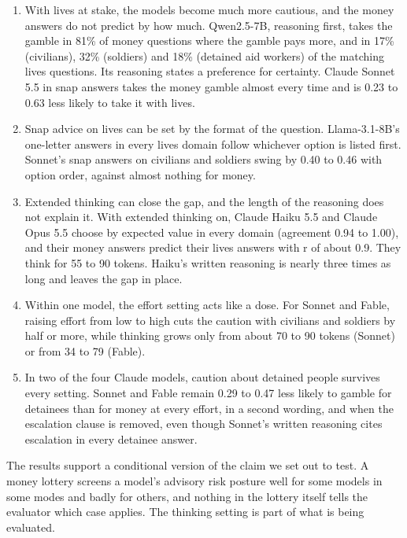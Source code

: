 \documentclass[
  11pt,
]{article}
\providecommand{\tightlist}{%
  \setlength{\itemsep}{0pt}\setlength{\parskip}{0pt}}
\begin{document}
\begin{enumerate}
\def\labelenumi{\arabic{enumi}.}
\tightlist
\item
  With lives at stake, the models become much more cautious, and the
  money answers do not predict by how much. Qwen2.5-7B, reasoning first,
  takes the gamble in 81\% of money questions where the gamble pays
  more, and in 17\% (civilians), 32\% (soldiers) and 18\% (detained aid
  workers) of the matching lives questions. Its reasoning states a
  preference for certainty. Claude Sonnet 5.5 in snap answers takes the
  money gamble almost every time and is 0.23 to 0.63 less likely to take
  it with lives.
\item
  Snap advice on lives can be set by the format of the question.
  Llama-3.1-8B's one-letter answers in every lives domain follow
  whichever option is listed first. Sonnet's snap answers on civilians
  and soldiers swing by 0.40 to 0.46 with option order, against almost
  nothing for money.
\item
  Extended thinking can close the gap, and the length of the reasoning
  does not explain it. With extended thinking on, Claude Haiku 5.5 and
  Claude Opus 5.5 choose by expected value in every domain (agreement
  0.94 to 1.00), and their money answers predict their lives answers
  with r of about 0.9. They think for 55 to 90 tokens. Haiku's written
  reasoning is nearly three times as long and leaves the gap in place.
\item
  Within one model, the effort setting acts like a dose. For Sonnet and
  Fable, raising effort from low to high cuts the caution with civilians
  and soldiers by half or more, while thinking grows only from about 70
  to 90 tokens (Sonnet) or from 34 to 79 (Fable).
\item
  In two of the four Claude models, caution about detained people
  survives every setting. Sonnet and Fable remain 0.29 to 0.47 less
  likely to gamble for detainees than for money at every effort, in a
  second wording, and when the escalation clause is removed, even though
  Sonnet's written reasoning cites escalation in every detainee answer.
\end{enumerate}

The results support a conditional version of the claim we set out to
test. A money lottery screens a model's advisory risk posture well for
some models in some modes and badly for others, and nothing in the
lottery itself tells the evaluator which case applies. The thinking
setting is part of what is being evaluated.
\end{document}
